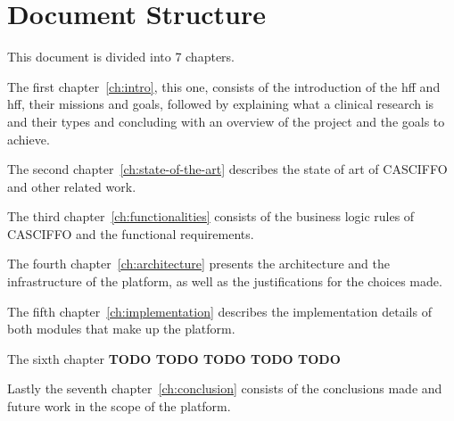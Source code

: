 \section{Document Structure}
This document is divided into 7 chapters. 

The first chapter~\ref{ch:intro}, this one, consists of the introduction of the \acrshort{hff} and \acrshort{hff}, their missions and goals, followed by explaining what a clinical research is and their types and concluding with an overview of the project and the goals to achieve. 

The second chapter~\ref{ch:state-of-the-art} describes the state of art of CASCIFFO and other related work.

The third chapter~\ref{ch:functionalities} consists of the business logic rules of CASCIFFO and the functional requirements. 

The fourth chapter~\ref{ch:architecture} presents the architecture and the infrastructure of the platform, as well as the justifications for the choices made. 

The fifth chapter~\ref{ch:implementation} describes the implementation details of both modules that make up the platform. 

The sixth chapter \textbf{TODO TODO TODO TODO TODO}

Lastly the seventh chapter~\ref{ch:conclusion} consists of the conclusions made and future work in the scope of the platform.

